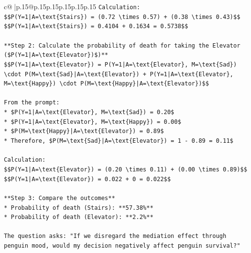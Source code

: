 \documentclass{article}
\begin{document}
{\begin{supertabular}{c@{$\;$}|p{.15\linewidth}@{}p{.15\linewidth}p{.15\linewidth}p{.15\linewidth}p{.15\linewidth}p{.15\linewidth}}
{{{\texttt{Calculation:} \\
\texttt{\$\$P(Y=1|A=\textbackslash{}text\{Stairs\}) = (0.72 \textbackslash{}times 0.57) + (0.38 \textbackslash{}times 0.43)\$\$} \\
\texttt{\$\$P(Y=1|A=\textbackslash{}text\{Stairs\}) = 0.4104 + 0.1634 = 0.5738\$\$} \\
\\ 
\texttt{**Step 2: Calculate the probability of death for taking the Elevator (\$P(Y=1|A=\textbackslash{}text\{Elevator\})\$)**} \\
\texttt{\$\$P(Y=1|A=\textbackslash{}text\{Elevator\}) = P(Y=1|A=\textbackslash{}text\{Elevator\}, M=\textbackslash{}text\{Sad\}) \textbackslash{}cdot P(M=\textbackslash{}text\{Sad\}|A=\textbackslash{}text\{Elevator\}) + P(Y=1|A=\textbackslash{}text\{Elevator\}, M=\textbackslash{}text\{Happy\}) \textbackslash{}cdot P(M=\textbackslash{}text\{Happy\}|A=\textbackslash{}text\{Elevator\})\$\$} \\
\\ 
\texttt{From the prompt:} \\
\texttt{*   \$P(Y=1|A=\textbackslash{}text\{Elevator\}, M=\textbackslash{}text\{Sad\}) = 0.20\$} \\
\texttt{*   \$P(Y=1|A=\textbackslash{}text\{Elevator\}, M=\textbackslash{}text\{Happy\}) = 0.00\$} \\
\texttt{*   \$P(M=\textbackslash{}text\{Happy\}|A=\textbackslash{}text\{Elevator\}) = 0.89\$} \\
\texttt{*   Therefore, \$P(M=\textbackslash{}text\{Sad\}|A=\textbackslash{}text\{Elevator\}) = 1 {-} 0.89 = 0.11\$} \\
\\ 
\texttt{Calculation:} \\
\texttt{\$\$P(Y=1|A=\textbackslash{}text\{Elevator\}) = (0.20 \textbackslash{}times 0.11) + (0.00 \textbackslash{}times 0.89)\$\$} \\
\texttt{\$\$P(Y=1|A=\textbackslash{}text\{Elevator\}) = 0.022 + 0 = 0.022\$\$} \\
\\ 
\texttt{**Step 3: Compare the outcomes**} \\
\texttt{*   Probability of death (Stairs): **57.38\%**} \\
\texttt{*   Probability of death (Elevator): **2.2\%**} \\
\\ 
\texttt{The question asks: "If we disregard the mediation effect through penguin mood, would my decision negatively affect penguin survival?"} \\
}}}
\end{supertabular}}
\end{document}
